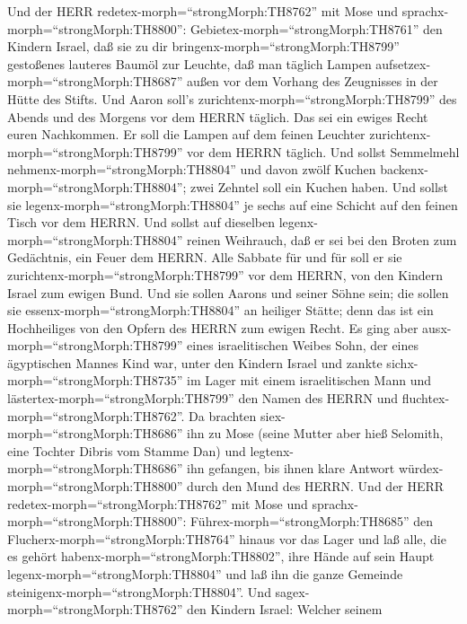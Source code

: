  Und der HERR redetex-morph=``strongMorph:TH8762'' mit Mose
und sprachx-morph=``strongMorph:TH8800'': 
Gebietex-morph=``strongMorph:TH8761'' den Kindern Israel, daß sie zu dir
bringenx-morph=``strongMorph:TH8799'' gestoßenes lauteres Baumöl zur
Leuchte, daß man täglich Lampen aufsetzex-morph=``strongMorph:TH8687''
 außen vor dem Vorhang des Zeugnisses in der Hütte des
Stifts. Und Aaron soll's zurichtenx-morph=``strongMorph:TH8799'' des
Abends und des Morgens vor dem HERRN täglich. Das sei ein ewiges Recht
euren Nachkommen.  Er soll die Lampen auf dem feinen
Leuchter zurichtenx-morph=``strongMorph:TH8799'' vor dem HERRN täglich.
 Und sollst Semmelmehl nehmenx-morph=``strongMorph:TH8804''
und davon zwölf Kuchen backenx-morph=``strongMorph:TH8804''; zwei
Zehntel soll ein Kuchen haben.  Und sollst sie
legenx-morph=``strongMorph:TH8804'' je sechs auf eine Schicht auf den
feinen Tisch vor dem HERRN.  Und sollst auf dieselben
legenx-morph=``strongMorph:TH8804'' reinen Weihrauch, daß er sei bei den
Broten zum Gedächtnis, ein Feuer dem HERRN.  Alle Sabbate
für und für soll er sie zurichtenx-morph=``strongMorph:TH8799'' vor dem
HERRN, von den Kindern Israel zum ewigen Bund.  Und sie
sollen Aarons und seiner Söhne sein; die sollen sie
essenx-morph=``strongMorph:TH8804'' an heiliger Stätte; denn das ist ein
Hochheiliges von den Opfern des HERRN zum ewigen Recht.  Es
ging aber ausx-morph=``strongMorph:TH8799'' eines israelitischen Weibes
Sohn, der eines ägyptischen Mannes Kind war, unter den Kindern Israel
und zankte sichx-morph=``strongMorph:TH8735'' im Lager mit einem
israelitischen Mann  und
lästertex-morph=``strongMorph:TH8799'' den Namen des HERRN und
fluchtex-morph=``strongMorph:TH8762''. Da brachten
siex-morph=``strongMorph:TH8686'' ihn zu Mose (seine Mutter aber hieß
Selomith, eine Tochter Dibris vom Stamme Dan)  und
legtenx-morph=``strongMorph:TH8686'' ihn gefangen, bis ihnen klare
Antwort würdex-morph=``strongMorph:TH8800'' durch den Mund des HERRN.
 Und der HERR redetex-morph=``strongMorph:TH8762'' mit Mose
und sprachx-morph=``strongMorph:TH8800'': 
Führex-morph=``strongMorph:TH8685'' den
Flucherx-morph=``strongMorph:TH8764'' hinaus vor das Lager und laß alle,
die es gehört habenx-morph=``strongMorph:TH8802'', ihre Hände auf sein
Haupt legenx-morph=``strongMorph:TH8804'' und laß ihn die ganze Gemeinde
steinigenx-morph=``strongMorph:TH8804''.  Und
sagex-morph=``strongMorph:TH8762'' den Kindern Israel: Welcher seinem
